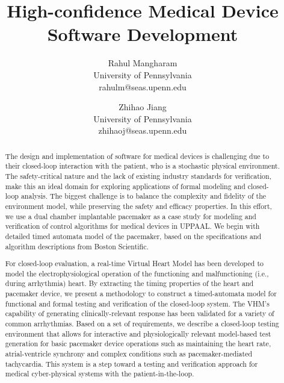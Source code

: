 \documentclass[openany]{now} %
\title{High-confidence Medical Device Software Development}
\author{
Rahul Mangharam \\
University of Pennsylvania\\
rahulm@seas.upenn.edu\and Zhihao Jiang \\
University of Pennsylvania\\
zhihaoj@seas.upenn.edu}
\begin{document}

\frontmatter  %

\maketitle

\tableofcontents

\mainmatter

\begin{abstract}
The design and implementation of software for medical devices is challenging due to their closed-loop interaction with the patient, who is a stochastic physical environment. The safety-critical nature and the lack of existing industry standards for verification, make this an ideal domain for exploring applications of formal modeling and closed-loop analysis. The biggest challenge is to balance the complexity and fidelity of the environment model, while preserving the safety and efficacy properties. In this effort, we use a dual chamber implantable pacemaker as a case study for modeling and verification of control algorithms for medical devices in UPPAAL. We begin with detailed timed automata model of the pacemaker, based on the specifications and algorithm descriptions from Boston Scientific. 

For closed-loop evaluation, a real-time Virtual Heart Model has been developed to model the electrophysiological operation of the functioning and malfunctioning (i.e., during arrhythmia) heart. By extracting the timing properties of the heart and pacemaker device, we present a methodology to construct a timed-automata model for functional and formal testing and verification of the closed-loop system. The VHM's capability of generating clinically-relevant response has been validated for a variety of common arrhythmias. Based on a set of requirements, we describe a closed-loop testing environment that allows for interactive and physiologically relevant model-based test generation for basic pacemaker device operations such as maintaining the heart rate, atrial-ventricle synchrony and complex conditions such as pacemaker-mediated tachycardia. This system is a step toward a testing and verification approach for medical cyber-physical systems with the patient-in-the-loop.

\end{abstract}














\backmatter







\end{document}
